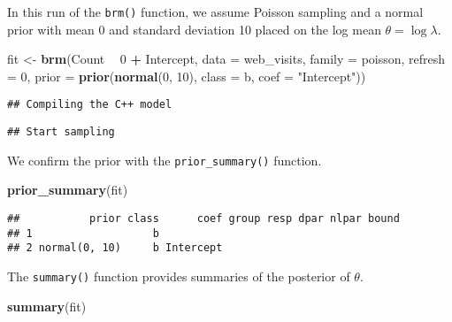 \documentclass[
]{book}
\newenvironment{Shaded}{\begin{snugshade}}{\end{snugshade}}
\newcommand{\DataTypeTok}[1]{\textcolor[rgb]{0.13,0.29,0.53}{#1}}
\newcommand{\DecValTok}[1]{\textcolor[rgb]{0.00,0.00,0.81}{#1}}
\newcommand{\KeywordTok}[1]{\textcolor[rgb]{0.13,0.29,0.53}{\textbf{#1}}}
\newcommand{\NormalTok}[1]{#1}
\newcommand{\OperatorTok}[1]{\textcolor[rgb]{0.81,0.36,0.00}{\textbf{#1}}}
\newcommand{\StringTok}[1]{\textcolor[rgb]{0.31,0.60,0.02}{#1}}
\begin{document}
In this run of the \texttt{brm()} function, we assume Poisson sampling and a normal prior with mean 0 and standard deviation 10 placed on the log mean \(\theta = \log \lambda\).

\begin{Shaded}
\begin{Highlighting}[]
\NormalTok{fit <-}\StringTok{ }\KeywordTok{brm}\NormalTok{(Count }\OperatorTok{~}\StringTok{ }\DecValTok{0} \OperatorTok{+}\StringTok{ }\NormalTok{Intercept, }
            \DataTypeTok{data =}\NormalTok{ web_visits,}
            \DataTypeTok{family =}\NormalTok{ poisson,}
             \DataTypeTok{refresh =} \DecValTok{0}\NormalTok{,}
           \DataTypeTok{prior =} \KeywordTok{prior}\NormalTok{(}\KeywordTok{normal}\NormalTok{(}\DecValTok{0}\NormalTok{, }\DecValTok{10}\NormalTok{), }
                         \DataTypeTok{class =}\NormalTok{ b,}
                         \DataTypeTok{coef =} \StringTok{"Intercept"}\NormalTok{))}
\end{Highlighting}
\end{Shaded}

\begin{verbatim}
## Compiling the C++ model
\end{verbatim}

\begin{verbatim}
## Start sampling
\end{verbatim}

We confirm the prior with the \texttt{prior\_summary()} function.

\begin{Shaded}
\begin{Highlighting}[]
\KeywordTok{prior_summary}\NormalTok{(fit)}
\end{Highlighting}
\end{Shaded}

\begin{verbatim}
##           prior class      coef group resp dpar nlpar bound
## 1                   b                                      
## 2 normal(0, 10)     b Intercept
\end{verbatim}

The \texttt{summary()} function provides summaries of the posterior of \(\theta\).

\begin{Shaded}
\begin{Highlighting}[]
\KeywordTok{summary}\NormalTok{(fit)}
\end{Highlighting}
\end{Shaded}
\end{document}
